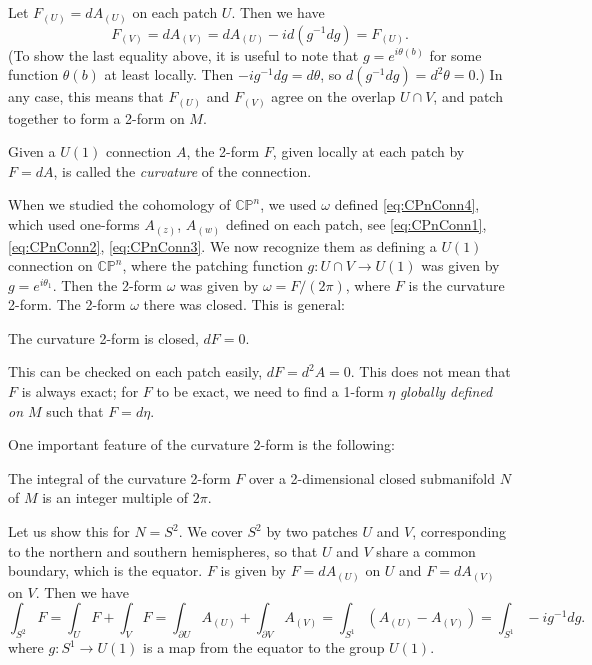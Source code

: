 \documentclass[12pt]{article}
\numberwithin{equation}{section}
\numberwithin{figure}{section}
\theoremstyle{remark}
\def\CP{\mathbb{CP}}
\begin{document}
Let $F_{(U)}=dA_{(U)}$ on each patch $U$.
Then we have \begin{equation}
F_{(V)}=dA_{(V)}=dA_{(U)} - i d(g^{-1} d g) = F_{(U)}.
\end{equation}
(To show the last equality above, 
it is useful to note that $g=e^{i\theta(b)}$ for some function $\theta(b)$
at least locally.
Then $-ig^{-1}dg = d\theta$, so $d(g^{-1}dg)=d^2\theta=0$.)
In any case, this means that $F_{(U)}$ and $F_{(V)}$ agree on the overlap $U\cap V$, and 
patch together to form a 2-form on $M$.
\begin{notation}
  Given a $U(1)$ connection $A$, 
the 2-form $F$, given locally at each patch by $F=dA$, is called the \emph{curvature} of the connection.
\end{notation}

When we studied the cohomology of $\CP^n$, we used $\omega$ defined \eqref{eq:CPnConn4},
which used one-forms $A_{(z)}$, $A_{(w)}$ defined on each patch, see  \eqref{eq:CPnConn1},  \eqref{eq:CPnConn2},  \eqref{eq:CPnConn3}.
We now recognize them as defining a $U(1)$ connection on $\CP^n$, where the patching function $g:U\cap V\to U(1)$
was given by $g = e^{i\theta_1}$.
Then the 2-form $\omega$ was  given by $\omega = F/(2\pi)$, where $F$ is the curvature 2-form.
The 2-form $\omega$ there was closed. This is general:
\begin{proposition}
The curvature 2-form is closed, $dF=0$.
\end{proposition}
This can be checked on each patch easily, $dF=d^2A=0$.
This does not mean that $F$ is always exact; for $F$ to be exact, 
we need to find a 1-form $\eta$ \emph{globally defined on $M$} 
such that $F=d\eta$.

One important feature of the curvature 2-form is the following:
\begin{proposition}
The integral of the curvature 2-form $F$ over a 2-dimensional closed submanifold $N$ of $M$ is an integer multiple of $2\pi$.
\end{proposition}
Let us show this for $N=S^2$.
We cover $S^2$ by two patches $U$ and $V$, corresponding to the northern and southern hemispheres,
so that $U$ and $V$ share a common boundary, which is the equator.
$F$ is given by $F=dA_{(U)}$ on $U$ and $F=dA_{(V)}$ on $V$.
Then we have \begin{equation}
  \int_{S^2} F = \int_{U} F+\int_V F
  = \int_{\partial U} A_{(U)} + \int_{\partial V} A_{(V)}
  = \int_{S^1} (A_{(U)}-A_{(V)})
  =\int_{S^1} -i g^{-1} dg.
\end{equation}
where $g:S^1\to U(1)$ is a map from the equator to the group $U(1)$.
\end{document}
